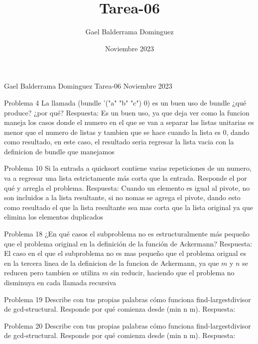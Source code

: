 \documentclass{article}
\author{Gael Balderrama Dominguez}
\title{Tarea-06}
\date{Noviembre 2023}
\begin{document}
\begin{center}
    Gael Balderrama Dominguez \linebreak
    Tarea-06 \linebreak
    Noviembre 2023 \linebreak
\end{center}
Problema 4 \newline
    La llamada (bundle '("a" "b" "c") 0) es un buen uso de bundle ¿qué produce? ¿por qué? \newline
    Respuesta: \newline
    Es un buen uso, ya que deja ver como la funcion maneja los casos donde el numero en el que se van a separar las listas unitarias es menor que el numero de listas y tambien que se hace cuando la lista es 0, dando como resultado, en este caso, el resultado seria regresar la lista vacia con la definicion de bundle que manejamos

Problema 10 \newline
    Si la entrada a quicksort contiene varias repeticiones de un numero, va a regresar una lista estrictamente más corta que la entrada. Responde
    el por qué y arregla el problema. \newline
    Respuesta: \newline
    Cuando un elemento es igual al pivote, no son incluidos a la lista resultante, si no nomas se agrega el pivote, dando esto como resultado el que la lista resultante sea mas corta que la lista original ya que elimina los elementos duplicados

Problema 18 \newline
    ¿En qué casos el subproblema no es estructuralmente más pequeño que el problema original en la definición de la función de Ackermann?\newline
    Respuesta: \newline
    El caso en el que el subproblema no es mas pequeño que el problema orignal es en la tercera linea de la definicion de la funcion de Ackermann, ya que $m$ y $n$ se reducen pero tambien se utiliza $m$ sin reducir, haciendo que el problema no disminuya en cada llamada recursiva 

Problema 19 \newline
    Describe con tus propias palabras cómo funciona find-largestdivisor de gcd-structural. Responde por qué comienza desde (min n m).\newline
    Respuesta: \newline
    
Problema 20 \newline 
    Describe con tus propias palabras cómo funciona find-largestdivisor de gcd-structural. Responde por qué comienza desde (min n m).\newline
    Respuesta: \newline
\end{document}
